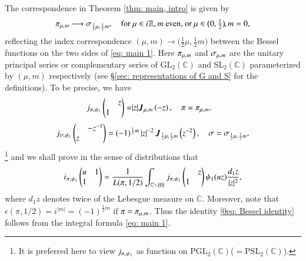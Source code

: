 \documentclass{amsproc}
\newcommand{\BC}{{\mathbb {C}}} \newcommand{\BD}{{\mathbb {D}}}
\newcommand{\GL}{{\mathrm {GL}}} \newcommand{\PGL}{{\mathrm {PGL}}}
\newcommand{\SL}{{\mathrm {SL}}} \newcommand{\PSL}{{\mathrm {PSL}}}
\def\-{^{-1}}
\def\lp {\left (}
\def\rp {\right )}
\def\bfJ {\boldsymbol J}
\def\shskip{\hskip 0.5 pt}
\theoremstyle{plain}
\numberwithin{equation}{section}
\begin{document}
	The correspondence in Theorem \ref{thm: main, intro} is given by
	\begin{align*}
	\pi_{\mu, \shskip m}  \longrightarrow \sigma_{\frac 1 2 \mu, \shskip \frac 1 2 m}, \hskip 10 pt \text{for } \mu \in i \shskip \BR, m \text{ even, or } \mu \in \big( 0, \tfrac 1 2\big) \hskip -1 pt , m = 0,
	\end{align*}
	reflecting the index correspondence $(\mu, m) \longrightarrow \big(\tfrac 1 2 \mu, \tfrac 1 2 m \big)$ between the   Bessel functions on the two sides of \eqref{eq: main 1}. Here $\pi_{\mu, \shskip m}  $ and $\sigma_{\mu, \shskip m} $ are the unitary principal series or complementary series of $\GL_2 (\BC)$ and $\SL_2 (\BC)$ parameterized by $(\mu, m)$ respectively (see \S \ref{sec: representations of G and S} for the definitions). To be precise, we have
	\begin{align*}
	j_{\pi, \shskip \psi_1} \begin{pmatrix}
	&  z \\ 1& \end{pmatrix} =  
	& |  z| \bfJ_{ \mu,\shskip   m} \lp - z \rp, \hskip 10 pt \pi = \pi_{\mu, \shskip m}, 
	\end{align*}
	\begin{align*}%
	j_{\sigma, \shskip \psi_1} \begin{pmatrix}
	& - z\- \\ z \\
	\end{pmatrix}  =  (-1)^{\frac 1 2 m} \left|   z \right|^{-2}  \bfJ_{\frac 1 2  \mu,\shskip \frac 1 2   m} \lp  z^{-2} \rp, \hskip 10 pt \sigma = \sigma_{\frac 1 2 \mu, \shskip \frac 1 2 m},
	\end{align*} \footnote{It is preferred here to view $	j_{\pi, \shskip \psi_1}$ as function on $\PGL_2 (\BC)$($= \PSL_2 (\BC)$).}
	and we shall prove in the sense of distributions that 
	\begin{align*}
	i_{\hskip 0.5 pt \pi, \hskip 0.5 pt \psi_1} \begin{pmatrix}
	u & 1 \\ 1 &
	\end{pmatrix} = \frac 1 {L (\pi, 1/2)} \int_{ \BC \smallsetminus \{0\}} j_{\pi, \shskip \psi_1} \begin{pmatrix}
	& z \\ 1& \end{pmatrix} \psi_1 ( u z) \frac {d_1 z} {|z|^2 },
	\end{align*} 
	where $d_1 z$ denotes twice of the Lebesgue measure on $\BC$. Moreover, note that $ \epsilon (\pi, 1/2) = i^{|m|} = (-1)^{\frac 1 2 m} $ if $ \pi = \pi_{\mu, \shskip m} $. Thus the identity \eqref{0eq: Bessel identity} follows from the integral formula \eqref{eq: main 1}.
	
\end{document}
